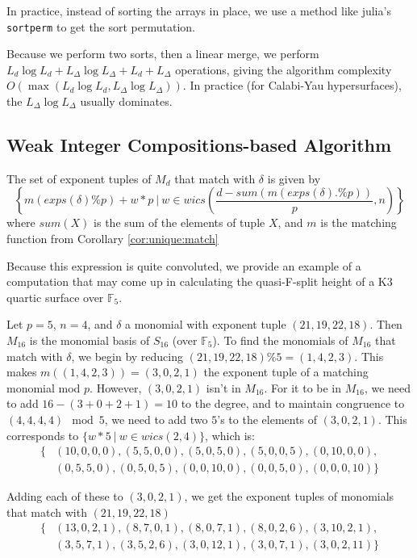 In practice, instead of sorting the arrays in place, 
we use a method like julia's \texttt{sortperm}
to get the sort permutation.

Because we perform two sorts, then a linear merge, we perform $L_{d} \log L_{d} + L_{\Delta} \log L_{\Delta} + L_{d} + L_{\Delta}$ operations, 
giving the algorithm complexity $O(\max(L_{d} \log L_{d}, L_{\Delta} \log L_{\Delta}))$.
In practice (for Calabi-Yau hypersurfaces), the $L_{\Delta} \log L_{\Delta}$ usually dominates.

\subsection{Weak Integer Compositions-based Algorithm}

\begin{lem}
    \label{lem:generate:matching}
    The set of exponent tuples of \(M_{d}\) that match with $\delta$ is given by 
    \[
        \left\{ m(exps(\delta) \% p) + w *p ~\Big|~ w \in wics \left(\frac{d - sum(m(exps(\delta) .\% p))}{p}, n \right) \right\}
    \]
    where $sum(X)$ is the sum of the elements of tuple $X$, and $m$ is the matching function from Corollary \ref{cor:unique:match}
\end{lem}

Because this expression is quite convoluted, we provide an example of a computation 
that may come up in calculating the quasi-F-split height of a K3 quartic surface over $\mathbb{F}_5$.

\begin{ex}
    Let $p = 5$, \(n = 4\), and $\delta$ a monomial with exponent tuple $(21, 19, 22, 18)$. 
    Then $M_16$ is the monomial basis of \(S_{16}\) (over $\mathbb{F}_5$). 
    To find the monomials of $M_{16}$ that match with $\delta$, we begin by reducing $(21, 19, 22, 18) \% 5 = (1, 4, 2, 3)$.
    This makes $m((1, 4, 2, 3)) = (3, 0, 2, 1)$ the exponent tuple of a matching monomial mod \(p\).
    However, \((3, 0, 2, 1)\) isn't in $M_16$. 
    For it to be in $M_16$, we need to add $16 - (3 + 0 + 2 + 1) = 10$ to the degree, and to maintain congruence to $(4, 4, 4, 4) \mod 5$, we need to add two $5$'s to the elements of $(3, 0, 2, 1)$. This corresponds to $\{w * 5 ~|~ w \in wics(2, 4)\}$, which is:
    \begin{align*}
        \{&(10, 0, 0, 0), (5, 5, 0, 0), (5, 0, 5, 0), (5, 0, 0, 5), (0, 10, 0, 0), \\
        &(0, 5, 5, 0), (0, 5, 0, 5), (0, 0, 10, 0), (0, 0, 5, 0), (0, 0, 0, 10)\}
    \end{align*}
        
    \noindent Adding each of these to $(3, 0, 2, 1)$, we get the exponent tuples of monomials that match with $(21, 19, 22, 18)$
    \begin{align*}
        \{&(13, 0, 2, 1), (8, 7, 0, 1), (8, 0, 7, 1), (8, 0, 2, 6), (3, 10, 2, 1), \\
        &(3, 5, 7, 1), (3, 5, 2, 6), (3, 0, 12, 1), (3, 0, 7, 1), (3, 0, 2, 11)\}
    \end{align*}    
\end{ex}

